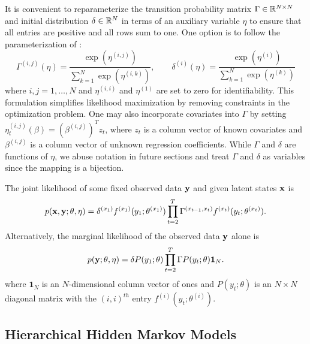 It is convenient to reparameterize the transition probability matrix $\Gamma \in \mathbb{R}^{N \times N}$ and initial distribution $\delta \in \mathbb{R}^N$ in terms of an auxiliary variable $\eta$ to ensure that all entries are positive and all rows sum to one. One option is to follow the parameterization of \citet{Barajas:2017}:
%
\begin{equation}
    \Gamma^{(i,j)}(\eta) = \frac{\exp(\eta^{(i,j)})}{\sum_{k=1}^N \exp(\eta^{(i,k)})}, \qquad \delta^{(i)}(\eta) = \frac{\exp(\eta^{(i)})}{\sum_{k=1}^N \exp(\eta^{(k)})}
    \label{eqn:reparam}
\end{equation}
%
where $i,j = 1,\ldots,N$ and $\eta^{(i,i)}$ and $\eta^{(1)}$ are set to zero for identifiability. This formulation simplifies likelihood maximization by removing constraints in the optimization problem. One may also incorporate covariates into $\Gamma$ by setting $\eta_t^{(i,j)}(\beta) = \left(\beta^{(i,j)}\right)^T z_t$, where $z_t$ is a column vector of known covariates and $\beta^{(i,j)}$ is a column vector of unknown regression coefficients. While $\Gamma$ and $\delta$ are functions of $\eta$, we abuse notation in future sections and treat $\Gamma$ and $\delta$ as variables since the mapping is a bijection.

The joint likelihood of some fixed observed data $\mathbf{y}$ and given latent states $\mathbf{x}$ is
%
\begin{equation}
    p(\mathbf{x},\mathbf{y};\theta,\eta) = \delta^{(x_1)} f^{(x_1)}(y_1; \theta^{(x_1)}) \prod_{t=2}^T \Gamma^{(x_{t-1},x_t)} f^{(x_t)}(y_t; \theta^{(x_t)}).
    \label{eqn:like}
\end{equation}
%
Alternatively, the marginal likelihood of the observed data $\mathbf{y}$ alone is 
%
\begin{equation}
    p(\mathbf{y};\theta,\eta) = \delta P(y_1;\theta) \prod_{t=2}^T \Gamma P(y_t;\theta) \mathbf{1}_N.
    \label{eqn:like_marginal}
\end{equation}
%
where $\mathbf{1}_N$ is an $N$-dimensional column vector of ones and $P(y_t;\theta)$ is an $N \times N$ diagonal matrix with the $(i,i)^{th}$ entry $f^{(i)}(y_t; \theta^{(i)})$.

\subsection{Hierarchical Hidden Markov Models}

